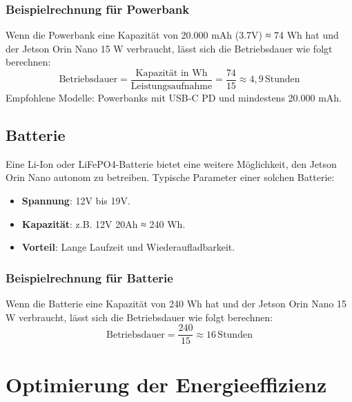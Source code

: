 \documentclass[12pt]{article}
\begin{document}
\subsubsection{Beispielrechnung für Powerbank}
Wenn die Powerbank eine Kapazität von 20.000 mAh (3.7V) ≈ 74 Wh hat und der Jetson Orin Nano 15 W verbraucht, lässt sich die Betriebsdauer wie folgt berechnen:
\[
\text{Betriebsdauer} = \frac{\text{Kapazität in Wh}}{\text{Leistungsaufnahme}} = \frac{74}{15} \approx 4,9 \, \text{Stunden}
\]
Empfohlene Modelle: Powerbanks mit USB-C PD und mindestens 20.000 mAh.

\subsection{Batterie}
Eine Li-Ion oder LiFePO4-Batterie bietet eine weitere Möglichkeit, den Jetson Orin Nano autonom zu betreiben. Typische Parameter einer solchen Batterie:
\begin{itemize}
    \item \textbf{Spannung}: 12V bis 19V.
    \item \textbf{Kapazität}: z.B. 12V 20Ah ≈ 240 Wh.
    \item \textbf{Vorteil}: Lange Laufzeit und Wiederaufladbarkeit.
\end{itemize}

\subsubsection{Beispielrechnung für Batterie}
Wenn die Batterie eine Kapazität von 240 Wh hat und der Jetson Orin Nano 15 W verbraucht, lässt sich die Betriebsdauer wie folgt berechnen:
\[
\text{Betriebsdauer} = \frac{240}{15} \approx 16 \, \text{Stunden}
\]

\section{Optimierung der Energieeffizienz}
\end{document}
